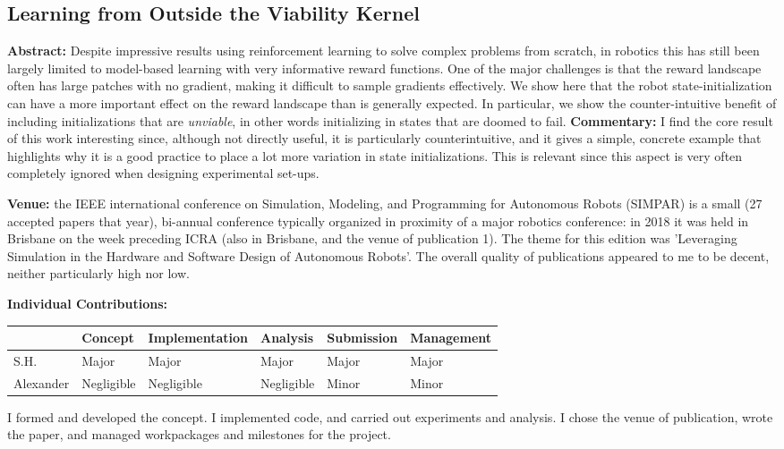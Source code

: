 \subsection{Learning from Outside the Viability Kernel}
\textbf{Abstract: }
Despite impressive results using reinforcement learning to solve complex problems from scratch, in robotics this has still been largely limited to model-based learning with very informative reward functions. One of the major challenges is that the reward landscape often has large patches with no gradient, making it difficult to sample gradients effectively. We show here that the robot state-initialization can have a more important effect on the reward landscape than is generally expected. In particular, we show the counter-intuitive benefit of including initializations that are \emph{unviable}, in other words initializing in states that are doomed to fail.
\textbf{Commentary: }
I find the core result of this work interesting since, although not directly useful, it is particularly counterintuitive, and it gives a simple, concrete example that highlights why it is a good practice to place a lot more variation in state initializations. This is relevant since this aspect is very often completely ignored when designing experimental set-ups.
\par
\textbf{Venue: }
the IEEE international conference on Simulation, Modeling, and Programming for Autonomous Robots (SIMPAR) is a small (27 accepted papers that year), bi-annual conference typically organized in proximity of a major robotics conference: in 2018 it was held in Brisbane on the week preceding ICRA (also in Brisbane, and the venue of publication 1). The theme for this edition was 'Leveraging Simulation in the Hardware and Software Design of Autonomous Robots'. The overall quality of publications appeared to me to be decent, neither particularly high nor low.
\par
\textbf{Individual Contributions: }
\begin{table}[h!]
\begin{tabular}{l|l|l|l|l|l|}
\cline{2-6}
 \textbf{} & \textbf{Concept} & {\footnotesize \textbf{Implementation}} & \textbf{Analysis} & \textbf{Submission} & {\footnotesize \textbf{Management}} \\ \hline
\multicolumn{1}{|l|}{S.H.} & Major & Major & Major & Major & Major \\ \hline
\multicolumn{1}{|l|}{Alexander} & Negligible & Negligible & Negligible & Minor & Minor \\ \hline
\end{tabular}
\end{table}
I formed and developed the concept. I implemented code, and carried out experiments and analysis. I chose the venue of publication, wrote the paper, and managed workpackages and milestones for the project. \\
